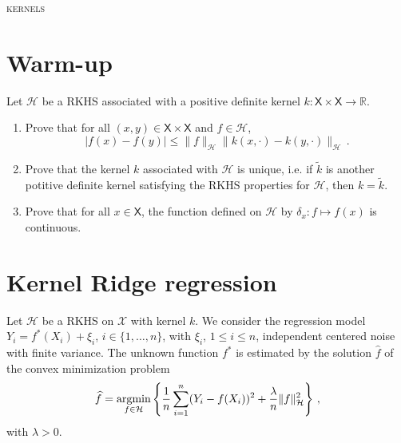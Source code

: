 \documentclass[a4paper,10pt,fleqn]{article}
\newcommand{\eqsp}{\,}
\newcommand{\rset}{\ensuremath{\mathbb{R}}}
\newcommand{\calH}{\ensuremath{\mathcal{H}}}
\newcommand{\xset}{\ensuremath{\mathsf{X}}}
\newcommand{\1}{\ensuremath{\mathbbm{1}}}
\newcommand{\argmin}{\mathop{\textrm{argmin}}}
\begin{document}

\noindent\hrulefill

\begin{center}
\textsc{kernels}
\end{center}
\hrulefill

\medskip



\section{Warm-up}
 Let $\calH$ be a RKHS associated with a positive definite kernel $k: \xset\times \xset \to \rset$.
\begin{enumerate}
\item  Prove that for all $(x,y)\in\xset\times \xset$ and $f \in \calH$, 
$$
|f(x)-f(y)|\leqslant \|f\|_{\calH}\|k(x,\cdot)-k(y,\cdot)\|_{\calH}\eqsp.
$$

%

\item  Prove that the kernel $k$ associated with $\calH$ is unique, i.e. if $\widetilde k$ is another potitive definite kernel satisfying the RKHS properties for $\calH$, then $k = \widetilde k$.

%

\item  Prove that  for all $x\in\xset$, the function defined on $\calH$ by $\delta_x: f \mapsto f(x)$ is continuous.

\vspace{.2cm}

{\em

}
\end{enumerate}

\section{Kernel Ridge regression}
Let $\mathcal{H}$ be a RKHS on $\mathcal{X}$ with kernel $k$.  We consider the regression model $Y_{i}=f^*(X_{i})+\xi_{i}$, $i\in\{1,\ldots,n\}$, with $\xi_{i}$, $1\leq i \leq n$,  independent centered noise with finite variance. The unknown function $f^*$ is estimated  by the solution 
$\widehat f$  of the convex minimization problem
$$\widehat f=\argmin_{f\in\mathcal{H}}\left\{{1\over n}\sum_{i=1}^n(Y_{i}-f(X_{i}))^2+{\lambda\over n} \|f\|_{\mathcal{H}}^2\right\}\,,$$
with $\lambda>0$.
\end{document}
